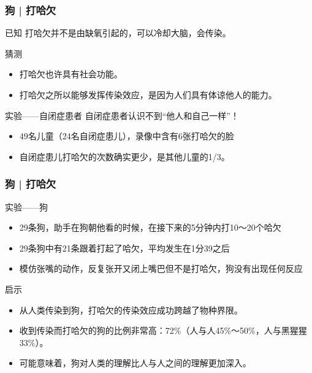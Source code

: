 \begin{frame}
  \frametitle{狗 | 打哈欠}
  \begin{block}{已知}
    打哈欠并不是由缺氧引起的，可以冷却大脑，会传染。
  \end{block}
  \pause
  \begin{block}{猜测}
    \begin{itemize}
      \item 打哈欠也许具有社会功能。
      \item 打哈欠之所以能够发挥传染效应，是因为人们具有体谅他人的能力。
    \end{itemize}
  \end{block}
  \pause
  \begin{block}{实验——自闭症患者}
    自闭症患者认识不到“他人和自己一样”！
    \begin{itemize}
      \item 49名儿童（24名自闭症患儿），录像中含有6张打哈欠的脸
      \item 自闭症患儿打哈欠的次数确实更少，是其他儿童的1/3。
    \end{itemize}
  \end{block}
\end{frame}

\begin{frame}
  \frametitle{狗 | 打哈欠}
  \begin{block}{实验——狗}
    \begin{itemize}
      \item 29条狗，助手在狗朝他看的时候，在接下来的5分钟内打10～20个哈欠
      \item 29条狗中有21条跟着打起了哈欠，平均发生在1分39之后
      \item 模仿张嘴的动作，反复张开又闭上嘴巴但不是打哈欠，狗没有出现任何反应
    \end{itemize}
  \end{block}
  \pause
  \begin{block}{启示}
    \begin{itemize}
      \item 从人类传染到狗，打哈欠的传染效应成功跨越了物种界限。
      \item 收到传染而打哈欠的狗的比例非常高：72\%（人与人45\%～50\%，人与黑猩猩33\%）。
      \item 可能意味着，狗对人类的理解比人与人之间的理解更加深入。
    \end{itemize}
  \end{block}
\end{frame}

